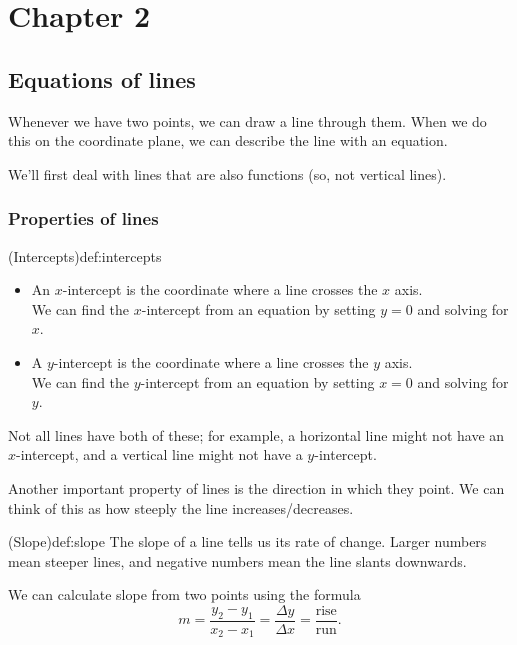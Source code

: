 \documentclass{article}
\begin{document}
\setcounter{section}{1}

\section{Chapter 2}

\subsection{Equations of lines}

Whenever we have two points, we can draw a line through them. When we do this on the coordinate plane, we can describe the line with an equation.

We'll first deal with lines that are also functions (so, not vertical lines).

\subsubsection{Properties of lines}

\begin{definition}{(Intercepts)}{def:intercepts}
    \begin{itemize}
        \item An $x$-intercept is the coordinate where a line crosses the $x$ axis.\\We can find the $x$-intercept from an equation by setting $y=0$ and solving for $x$.
        \item A $y$-intercept is the coordinate where a line crosses the $y$ axis.\\We can find the $y$-intercept from an equation by setting $x=0$ and solving for $y$.
    \end{itemize}
\end{definition}
Not all lines have both of these; for example, a horizontal line might not have an $x$-intercept, and a vertical line might not have a $y$-intercept.

Another important property of lines is the direction in which they point. We can think of this as how steeply the line increases/decreases.

\begin{definition}{(Slope)}{def:slope}
    The slope of a line tells us its rate of change. Larger numbers mean steeper lines, and negative numbers mean the line slants downwards.

    We can calculate slope from two points using the formula \[m = \frac{y_2-y_1}{x_2-x_1}=\frac{\Delta y}{\Delta x}=\frac{\text{rise}}{\text{run}}.\]
\end{definition}
\end{document}

